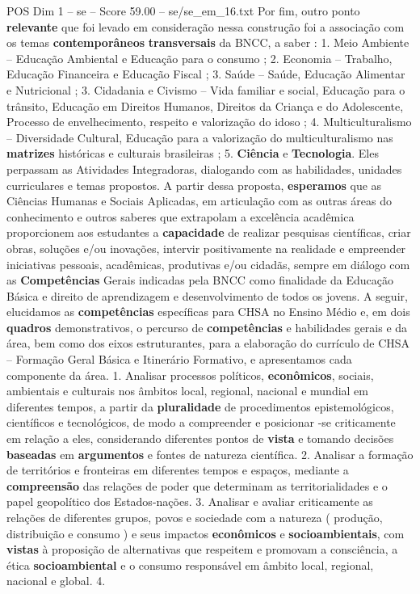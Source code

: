\begin{textsample}{POS Dim 1 – se – Score 59.00 – se/se\_em\_16.txt}
Por fim, outro ponto \textbf{relevante} que foi levado em consideração nessa construção foi a associação com os temas \textbf{contemporâneos} \textbf{transversais} da BNCC, a saber : 1.
Meio Ambiente – Educação Ambiental e Educação para o consumo ; 2.
Economia – Trabalho, Educação Financeira e Educação Fiscal ; 3.
Saúde – Saúde, Educação Alimentar e Nutricional ; 3.
Cidadania e Civismo – Vida familiar e social, Educação para o trânsito, Educação em Direitos Humanos, Direitos da Criança e do Adolescente, Processo de envelhecimento, respeito e valorização do idoso ; 4.
Multiculturalismo – Diversidade Cultural, Educação para a valorização do multiculturalismo nas \textbf{matrizes} históricas e culturais brasileiras ; 5. \textbf{Ciência} e \textbf{Tecnologia}.
Eles perpassam as Atividades Integradoras, dialogando com as habilidades, unidades curriculares e temas propostos.
A partir dessa proposta, \textbf{esperamos} que as Ciências Humanas e Sociais Aplicadas, em articulação com as outras áreas do conhecimento e outros saberes que extrapolam a excelência acadêmica proporcionem aos estudantes a \textbf{capacidade} de realizar pesquisas científicas, criar obras, soluções e/ou inovações, intervir positivamente na realidade e empreender iniciativas pessoais, acadêmicas, produtivas e/ou cidadãs, sempre em diálogo com as \textbf{Competências} Gerais indicadas pela BNCC como finalidade da Educação Básica e direito de aprendizagem e desenvolvimento de todos os jovens.
A seguir, elucidamos as \textbf{competências} específicas para CHSA no Ensino Médio e, em dois \textbf{quadros} demonstrativos, o percurso de \textbf{competências} e habilidades gerais e da área, bem como dos eixos estruturantes, para a elaboração do currículo de CHSA – Formação Geral Básica e Itinerário Formativo, e apresentamos cada componente da área. 1.
Analisar processos políticos, \textbf{econômicos}, sociais, ambientais e culturais nos âmbitos local, regional, nacional e mundial em diferentes tempos, a partir da \textbf{pluralidade} de procedimentos epistemológicos, científicos e tecnológicos, de modo a compreender e posicionar -se criticamente em relação a eles, considerando diferentes pontos de \textbf{vista} e tomando decisões \textbf{baseadas} em \textbf{argumentos} e fontes de natureza científica. 2.
Analisar a formação de territórios e fronteiras em diferentes tempos e espaços, mediante a \textbf{compreensão} das relações de poder que determinam as territorialidades e o papel geopolítico dos Estados-nações. 3.
Analisar e avaliar criticamente as relações de diferentes grupos, povos e sociedade com a natureza ( produção, distribuição e consumo ) e seus impactos \textbf{econômicos} e \textbf{socioambientais}, com \textbf{vistas} à proposição de alternativas que respeitem e promovam a consciência, a ética \textbf{socioambiental} e o consumo responsável em âmbito local, regional, nacional e global. 4.

\end{textsample}
